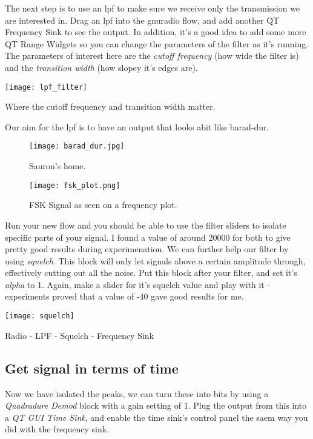 The next step is to use an \gls{lpf} to make sure we receive only the transmission we are interested in. Drag an \gls{lpf} into the gnuradio flow, and add another QT Frequency Sink to see the output. In addition, it's a good idea to add some more QT Range Widgets so you can change the parameters of the filter as it's running. The parameters of interest here are the \textit{cutoff frequency} (how wide the filter is) and the \textit{transition width} (how slopey it's edges are). 

\centrefigurestart
\texttt{[image: lpf\_filter]}
\caption{Where the cutoff frequency and transition width matter.}
\centrefigureend

Our aim for the \gls{lpf} is to have an output that looks abit like barad-dur.

\begin{figure}[H]
    \centering
    \begin{minipage}{0.45\textwidth}
        \centering
        \texttt{[image: barad\_dur.jpg]} 
        \caption{Sauron's home.}
    \end{minipage}\hfill
    \begin{minipage}{0.45\textwidth}
        \centering
        \texttt{[image: fsk\_plot.png]}
        \caption{FSK Signal as seen on a frequency plot.}
    \end{minipage}
\end{figure}

Run your new flow and you should be able to use the filter sliders to isolate specific parts of your signal. I found a value of around 20000 for both to give pretty good results during experimenation. We can further help our filter by using \textit{squelch}. This block will only let signals above a certain amplitude through, effectively cutting out all the noise. Put this block after your filter, and set it's \textit{alpha} to 1. Again, make a slider for it's squelch value and play with it - experiments proved that a value of -40 gave good results for me.

\centrefigurestart
\texttt{[image: squelch]}
\caption{Radio - LPF - Squelch - Frequency Sink}
\centrefigureend

\subsection{Get signal in terms of time}
Now we have isolated the peaks, we can turn these into bits by using a \textit{Quadradure Demod} block with a gain setting of 1. Plug the output from this into a \textit{QT GUI Time Sink}, and enable the time sink's control panel the saem way you did with the frequency sink. 

